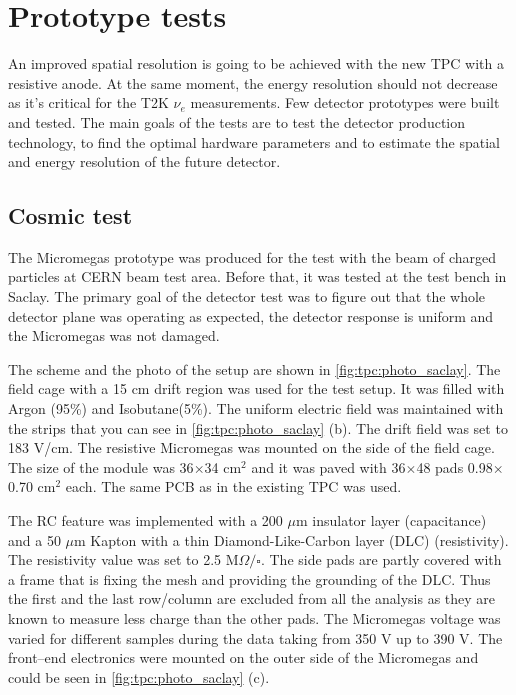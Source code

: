 \documentclass[../main.tex]{subfiles}
\begin{document}
\section{Prototype tests}
An improved spatial resolution is going to be achieved with the new TPC with a resistive anode. At the same moment, the energy resolution should not decrease as it's critical for the T2K $\nu_e$ measurements. Few detector prototypes were built and tested. The main goals of the tests are to test the detector production technology, to find the optimal hardware parameters and to estimate the spatial and energy resolution of the future detector.

\subsection{Cosmic test}
\label{sec:up:saclay}
The Micromegas prototype was produced for the test with the beam of charged particles at CERN beam test area. Before that, it was tested at the test bench in Saclay. The primary goal of the detector test was to figure out that the whole detector plane was operating as expected, the detector response is uniform and the Micromegas was not damaged.

The scheme and the photo of the setup are shown in \autoref{fig:tpc:photo_saclay}. The field cage with a 15 cm drift region was used for the test setup. It was filled with Argon (95\%) and Isobutane(5\%). The uniform electric field was maintained with the strips that you can see in \autoref{fig:tpc:photo_saclay} (b). The drift field was set to 183 V/cm. The resistive Micromegas was mounted on the side of the field cage. The size of the module was 36$\times$34 $\text{cm}^2$ and it was paved with 36$\times$48 pads 0.98$\times$0.70 $\text{cm}^2$ each. The same PCB as in the existing TPC was used.

The RC feature was implemented with a 200 $\mu\text{m}$ insulator layer (capacitance) and a 50 $\mu\text{m}$ Kapton with a thin Diamond-Like-Carbon layer (DLC) (resistivity). The resistivity value was set to 2.5 $\text{M}\Omega/\square$. The side pads are partly covered with a frame that is fixing the mesh and providing the grounding of the DLC. Thus the first and the last row/column are excluded from all the analysis as they are known to measure less charge than the other pads. The Micromegas voltage was varied for different samples during the data taking from 350 V up to 390 V. The front--end electronics were mounted on the outer side of the Micromegas and could be seen in \autoref{fig:tpc:photo_saclay} (c).
\end{document}
